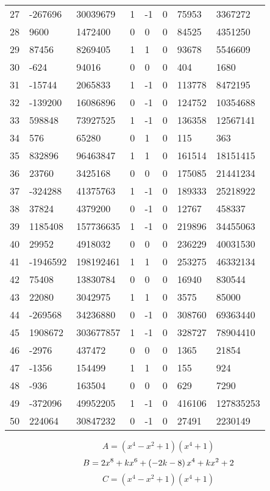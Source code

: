 \documentclass{amsart}
\begin{document}
\begin{longtable}{|l|l|l|lllll|}
27&-267696&30039679&1&-1&0&75953&3367272\\
28&9600&1472400&0&0&0&84525&4351250\\
29&87456&8269405&1&1&0&93678&5546609\\
30&-624&94016&0&0&0&404&1680\\
31&-15744&2065833&1&-1&0&113778&8472195\\
32&-139200&16086896&0&-1&0&124752&10354688\\
33&598848&73927525&1&-1&0&136358&12567141\\
34&576&65280&0&1&0&115&363\\
35&832896&96463847&1&1&0&161514&18151415\\
36&23760&3425168&0&0&0&175085&21441234\\
37&-324288&41375763&1&-1&0&189333&25218922\\
38&37824&4379200&0&-1&0&12767&458337\\
39&1185408&157736635&1&-1&0&219896&34455063\\
40&29952&4918032&0&0&0&236229&40031530\\
41&-1946592&198192461&1&1&0&253275&46332134\\
42&75408&13830784&0&0&0&16940&830544\\
43&22080&3042975&1&1&0&3575&85000\\
44&-269568&34236880&0&-1&0&308760&69363440\\
45&1908672&303677857&1&-1&0&328727&78904410\\
46&-2976&437472&0&0&0&1365&21854\\
47&-1356&154499&1&1&0&155&924\\
48&-936&163504&0&0&0&629&7290\\
49&-372096&49952205&1&-1&0&416106&127835253\\
50&224064&30847232&0&-1&0&27491&2230149\\
\hline
\end{longtable}
$$A=(x^4
 - x^2
 + 1)(x^4
 + 1)$$
$$B=2\*x^8
 + k\*x^6
 + \left(-2\*k
 - 8\right) \*x^4
 + k\*x^2
 + 2$$
$$C=(x^4
 - x^2
 + 1)(x^4
 + 1)$$
\end{document}
